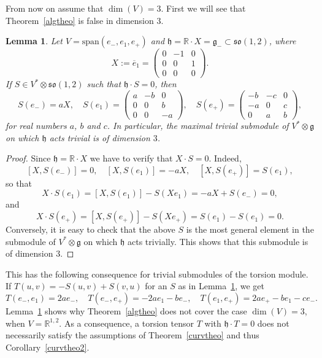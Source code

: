 \documentclass[11pt,a4paper]{amsart}
\newcommand{\p}{\mathfrak{p}}
\newcommand{\g}{\mathfrak{g}}
\newcommand{\h}{\mathfrak{h}}
\newcommand{\+}{\oplus}
\newcommand{\so}{\mathfrak{so}}
\renewcommand{\span}{\mathrm{span}}
\newcommand{\1}{\mathbf{1}}
\newcommand{\R}{\mathbb{R}} %
\newcommand{\<}{\langle}
\renewcommand{\>}{\rangle}
\theoremstyle{definition}
\theoremstyle{plain}
\newtheorem{lemma}[definition]{Lemma}
\numberwithin{equation}{section}
\begin{document}
From now on assume that $\dim(V)=3$.
First we will see that Theorem~\ref{algtheo} is false in dimension $3$.
\begin{lemma}
\label{example1}
Let $V=\span(e_-,e_1,e_+)$ and  $\h=\R\cdot X=\g_-\subset \so(1,2)$, where 
\[ X:= \overline{e}_1= \begin{pmatrix}
0&-1&0\\ 0&0&1 \\0&0&0\end{pmatrix}.\]
If  $S\in V^*\otimes \so(1,2)$ such that $\h\cdot S=0$, then
\[S(e_-)=a X,
\quad 
S(e_1)= 
\begin{pmatrix}
a&-b&0\\ 0&0&b \\0&0&-a\end{pmatrix} 
,
\quad
S(e_+)= 
\begin{pmatrix}
-b&-c&0\\ -a&0&c \\0&a&b\end{pmatrix}
,
\]
for real numbers $a$, $b$ and $c$. 
In particular, the maximal trivial submodule of $V^*\otimes \g$ on which $\h$ acts trivial is of dimension $3$. 
\end{lemma}

\begin{proof}
Since $\h=\R\cdot X$
we have to verify that $X\cdot S=0$. Indeed, 
\[ [X,S(e_-)]=0,\quad [X,S(e_1)] =-aX,\quad   [X,S(e_+)] =S(e_1),\]
so that 
\[ X\cdot S (e_1)=[X, S(e_1)] -S(Xe_1)= -aX +S(e_-)=0,\]
and 
\[ X\cdot S (e_+)=[X, S(e_+)] -S(Xe_+)= S(e_1) -S(e_1)=0.\]
Conversely, it is easy to check that the above $S$ is the most general element  in the submodule of  $V^*\otimes \g$ on which $\h$ acts trivially. This shows that this submodule is of dimension $3$.
\end{proof}
This has the following consequence for trivial submodules of the torsion module. If $T(u,v)=-S(u,v)+S(v,u)$ for an $S$ as in Lemma~\ref{example1}, we get
\[T(e_-,e_1)=2a e_-,\quad T(e_-,e_+)=-2a e_1 -b e_-,\quad
T(e_1,e_+)=2a e_+-be_1-ce_-.\]
 Lemma~\ref{example1} shows why Theorem~\ref{algtheo} does not cover the case $\dim(V)=3$, when $V=\R^{1,2}$. As a consequence,  a torsion tensor $T$ with $\h\cdot T=0$ does not necessarily satisfy the assumptions of Theorem~\ref{curvtheo} and thus Corollary~\ref{curvtheo2}. 
\end{document}
